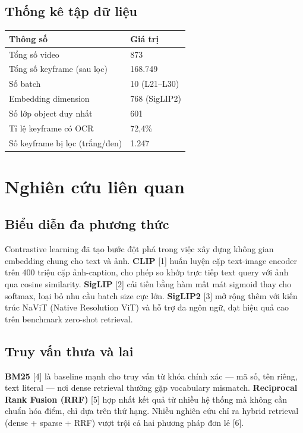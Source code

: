 \documentclass[12pt,a4paper,onecolumn]{article}
\begin{document}
\subsection{Thống kê tập dữ liệu}

\begin{center}
\begin{tabular}{l l}
\toprule
Thông số & Giá trị \\
\midrule
Tổng số video & 873 \\
Tổng số keyframe (sau lọc) & 168.749 \\
Số batch & 10 (L21–L30) \\
Embedding dimension & 768 (SigLIP2) \\
Số lớp object duy nhất & 601 \\
Tỉ lệ keyframe có OCR & 72,4\% \\
Số keyframe bị lọc (trắng/đen) & 1.247 \\
\bottomrule
\end{tabular}
\end{center}


\section{Nghiên cứu liên quan}

\subsection{Biểu diễn đa phương thức}

Contrastive learning đã tạo bước đột phá trong việc xây dựng không gian embedding chung cho text và ảnh. \textbf{CLIP} [1] huấn luyện cặp text-image encoder trên 400 triệu cặp ảnh-caption, cho phép so khớp trực tiếp text query với ảnh qua cosine similarity. \textbf{SigLIP} [2] cải tiến bằng hàm mất mát sigmoid thay cho softmax, loại bỏ nhu cầu batch size cực lớn. \textbf{SigLIP2} [3] mở rộng thêm với kiến trúc NaViT (Native Resolution ViT) và hỗ trợ đa ngôn ngữ, đạt hiệu quả cao trên benchmark zero-shot retrieval.

\subsection{Truy vấn thưa và lai}

\textbf{BM25} [4] là baseline mạnh cho truy vấn từ khóa chính xác — mã số, tên riêng, text literal — nơi dense retrieval thường gặp vocabulary mismatch. \textbf{Reciprocal Rank Fusion (RRF)} [5] hợp nhất kết quả từ nhiều hệ thống mà không cần chuẩn hóa điểm, chỉ dựa trên thứ hạng. Nhiều nghiên cứu chỉ ra hybrid retrieval (dense + sparse + RRF) vượt trội cả hai phương pháp đơn lẻ [6].
\end{document}
